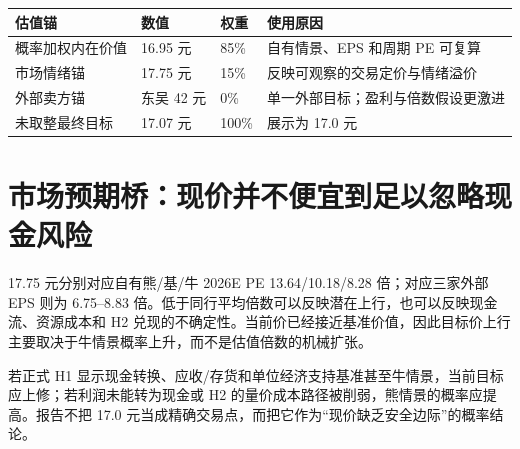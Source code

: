 \begin{exhibitbox}
\begin{tabularx}{\exhibitboxwidth}{L{3.4cm}R{2.4cm}R{2.1cm}X}
\toprule
估值锚 & 数值 & 权重 & 使用原因 \\
\midrule
概率加权内在价值 & 16.95 元 & 85\% & 自有情景、EPS 和周期 PE 可复算 \\
市场情绪锚 & 17.75 元 & 15\% & 反映可观察的交易定价与情绪溢价 \\
外部卖方锚 & 东吴 42 元 & 0\% & 单一外部目标；盈利与倍数假设更激进 \\
未取整最终目标 & 17.07 元 & 100\% & 展示为 17.0 元 \\
\bottomrule
\end{tabularx}
\end{exhibitbox}

\section{市场预期桥：现价并不便宜到足以忽略现金风险}

17.75 元分别对应自有熊/基/牛 2026E PE 13.64/10.18/8.28 倍；对应三家外部 EPS 则为 6.75--8.83 倍。低于同行平均倍数可以反映潜在上行，也可以反映现金流、资源成本和 H2 兑现的不确定性。当前价已经接近基准价值，因此目标价上行主要取决于牛情景概率上升，而不是估值倍数的机械扩张。

\begin{sourcequalitybox}[估值失效条件]
若正式 H1 显示现金转换、应收/存货和单位经济支持基准甚至牛情景，当前目标应上修；若利润未能转为现金或 H2 的量价成本路径被削弱，熊情景的概率应提高。报告不把 17.0 元当成精确交易点，而把它作为“现价缺乏安全边际”的概率结论。
\end{sourcequalitybox}
